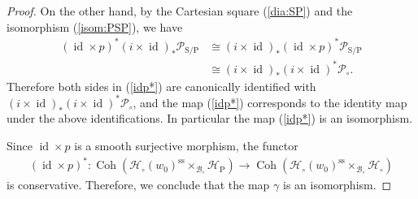 \documentclass[11pt,oneside,a4paper,mathscr]{amsart}
\theoremstyle{definition}
\newcommand{\cH}{\mathcal{H}}
\newcommand{\cB}{\mathcal{B}}
\newcommand{\cP}{\mathcal{P}}
\newcommand{\Coh}{\operatorname{Coh}}
\newcommand{\id}{\operatorname{id}}
\newcommand{\rS}{\mathrm{S}}
\newcommand{\rP}{\mathrm{P}}
\begin{document}
\begin{proof}
On the other hand, by the Cartesian square (\ref{dia:SP}) and the isomorphism (\ref{isom:PSP}), we have 
\begin{align*}
    (\id \times p)^* (i\times \id)_{*}\cP_{\rS/\rP} &\cong (i\times \id)_{*}(\id \times p)^* \cP_{\rS/\rP} \\
    &\cong (i\times \id)_{*}(i\times \id)^* \cP_{\circ}.
\end{align*}
Therefore both sides in (\ref{idp*}) are canonically identified with 
$(i\times \id)_{*}(i\times \id)^*\cP_{\circ}$, and the map (\ref{idp*}) 
corresponds to the identity map under the above identifications. 
In particular the map (\ref{idp*}) is an isomorphism. 

Since $\id\times p$ is a smooth surjective morphism, the functor 
\begin{align*}
    (\id \times p)^* \colon \Coh(\cH_{\circ}(w_0)^{\mathrm{ss}}\times_{\cB_{\circ}}\cH_{\rP}) \to \Coh(\cH_{\circ}(w_0)^{\mathrm{ss}}\times_{\cB_{\circ}}\cH_{\circ}) 
\end{align*}
is conservative. Therefore, 
we conclude that the map $\gamma$ is an isomorphism.  
\end{proof}
\end{document}
